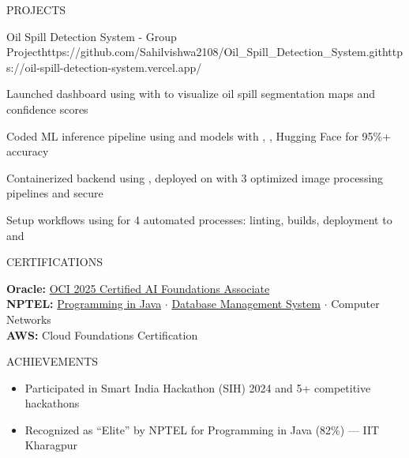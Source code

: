 \documentclass{resume}
\begin{document}
\begin{rSection}{PROJECTS}
\begin{rProject}{Oil Spill Detection System - Group Project}{https://github.com/Sahilvishwa2108/Oil_Spill_Detection_System.git}{https://oil-spill-detection-system.vercel.app/}
\item Launched dashboard using  with  to visualize oil spill segmentation maps and confidence scores
\item Coded ML inference pipeline using  and  models with , , Hugging Face for 95\%+ accuracy
\item Containerized backend using , deployed on  with 3 optimized image processing pipelines and secure 
\item Setup  workflows using  for 4 automated processes: linting, builds, deployment to  and 
\end{rProject}

\end{rSection}

\begin{rSection}{CERTIFICATIONS}

\textbf{Oracle:} \href{https://catalog-education.oracle.com/ords/certview/sharebadge?id=08DD03676BF6CB0DE9DA3D11E1F0F10FFE9F710A5961C592D02D1C3543E10050}{OCI 2025 Certified AI Foundations Associate} \\[1pt]
\textbf{NPTEL:} \href{https://archive.nptel.ac.in/content/noc/NOC25/SEM1/Ecertificates/106/noc25-cs57/Course/NPTEL25CS57S124280252304432710.pdf}{Programming in Java} $\cdot$ \href{https://archive.nptel.ac.in/content/noc/NOC25/SEM1/Ecertificates/106/noc25-cs18/Course/NPTEL25CS18S53880028401363129.pdf}{Database Management System} $\cdot$ {Computer Networks} \\[1pt]
\textbf{AWS:} {Cloud Foundations Certification}

\end{rSection}

\begin{rSection}{ACHIEVEMENTS}

\begin{itemize}[leftmargin=12pt, itemsep=0pt, label={\small$\bullet$}]
\item Participated in Smart India Hackathon (SIH) 2024 and 5+ competitive hackathons
\item Recognized as ``Elite'' by NPTEL for Programming in Java (82\%) — IIT Kharagpur
\end{itemize}

\end{rSection}
\end{document}
